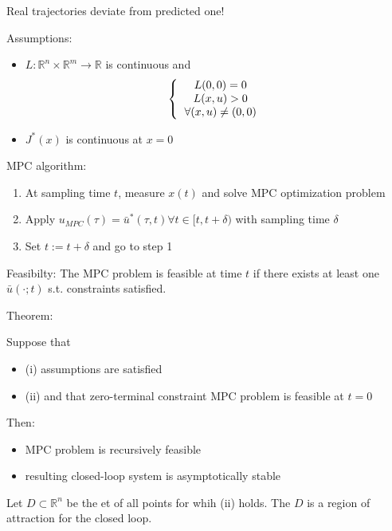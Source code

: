 Real trajectories deviate from predicted one!

Assumptions:
\begin{itemize}
\item $L: \mathbb{R}^n \times \mathbb{R}^m \to \mathbb{R}$ is continuous and 
\begin{equation}
\left \{
  \begin{tabular}{c}
  $L(0,0)=0$ \\
  $L(x,u) > 0$ \\
  $\forall (x,u) \neq (0,0)$
  \end{tabular}
 \right.
\end{equation}
\item $J^*(x)$ is continuous at $x=0$
\end{itemize}

MPC algorithm:
\begin{enumerate}
\item At sampling time $t$, measure $x(t)$ and solve MPC optimization problem 
\item Apply $u_{MPC}(\tau) = \bar u^*(\tau, t) \forall t \in [t, t+\delta)$ with sampling time $\delta$
\item Set $t := t + \delta $ and go to step 1
\end{enumerate}

Feasibilty: The MPC problem is feasible at time $t$ if there exists at least one $\bar u(\cdot; t)$ s.t. constraints satisfied.

Theorem:

Suppose that 
\begin{itemize}
\item (i) assumptions are satisfied 
\item (ii) and that zero-terminal constraint MPC problem is feasible at $t = 0$
\end{itemize}
Then: 
\begin{itemize}
\item MPC problem is recursively feasible 
\item resulting closed-loop system is asymptotically stable 
\end{itemize}

Let $D \subset \mathbb{R}^n$ be the et of all points for whih (ii) holds. The $D$ is a region of attraction for the closed loop.


